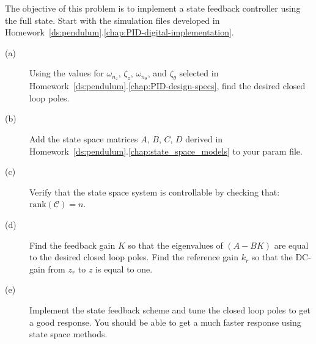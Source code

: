 The objective of this problem is to implement a state feedback controller using the full state.
Start with the simulation files developed in Homework~\ref{ds:pendulum}.\ref{chap:PID-digital-implementation}.
\begin{description}
\item[(a)] Using the values for $\omega_{n_z}$, $\zeta_z$, $\omega_{n_{\theta}}$, and $\zeta_{\theta}$ selected in Homework~\ref{ds:pendulum}.\ref{chap:PID-design-specs}, find the desired closed loop poles.  
\item[(b)] Add the state space matrices $A$, $B$, $C$, $D$ derived in Homework~\ref{ds:pendulum}.\ref{chap:state_space_models} to your param file.
\item[(c)] Verify that the state space system is controllable by checking that: $\text{rank}(\mathcal{C})=n$.
\item[(d)] Find the feedback gain $K$ so that the eigenvalues of $(A-BK)$ are equal to the desired closed loop poles.  Find the reference gain $k_r$ so that the DC-gain from $z_r$ to $z$ is equal to one.  
\item[(e)] Implement the state feedback scheme and tune the closed loop poles to get a good response.  You should be able to get a much faster response using state space methods.
\end{description}

